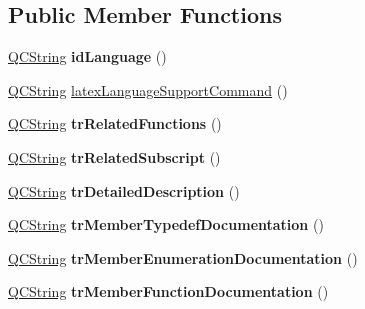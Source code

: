 \subsection*{Public Member Functions}
\begin{DoxyCompactItemize}
\item 
\mbox{\label{class_translator_slovene_a5710eb456d050b1cf3b9053209e358c5}} 
\mbox{\hyperlink{class_q_c_string}{Q\+C\+String}} {\bfseries id\+Language} ()
\item 
\mbox{\hyperlink{class_q_c_string}{Q\+C\+String}} \mbox{\hyperlink{class_translator_slovene_a8c1f38606d2f5bbc776ddaeba44539dc}{latex\+Language\+Support\+Command}} ()
\item 
\mbox{\label{class_translator_slovene_a6b1b555bbca8b84fdfed13c04e23c5a2}} 
\mbox{\hyperlink{class_q_c_string}{Q\+C\+String}} {\bfseries tr\+Related\+Functions} ()
\item 
\mbox{\label{class_translator_slovene_ad67dd47528ff8b68f5a990bef893c040}} 
\mbox{\hyperlink{class_q_c_string}{Q\+C\+String}} {\bfseries tr\+Related\+Subscript} ()
\item 
\mbox{\label{class_translator_slovene_a630618724967bd7b1da822f2bbd3142e}} 
\mbox{\hyperlink{class_q_c_string}{Q\+C\+String}} {\bfseries tr\+Detailed\+Description} ()
\item 
\mbox{\label{class_translator_slovene_a84a2f96682a5e4b6d7054716771f6151}} 
\mbox{\hyperlink{class_q_c_string}{Q\+C\+String}} {\bfseries tr\+Member\+Typedef\+Documentation} ()
\item 
\mbox{\label{class_translator_slovene_a244760bf3721fd5b1519caab95d9f268}} 
\mbox{\hyperlink{class_q_c_string}{Q\+C\+String}} {\bfseries tr\+Member\+Enumeration\+Documentation} ()
\item 
\mbox{\label{class_translator_slovene_aa1aebd43e999f38b353c964f8bf329cb}} 
\mbox{\hyperlink{class_q_c_string}{Q\+C\+String}} {\bfseries tr\+Member\+Function\+Documentation} ()
\item 
\mbox{\label{class_translator_slovene_a7adcc9408f259dc4dea9d15001e5136c}} 

\end{DoxyCompactItemize}
